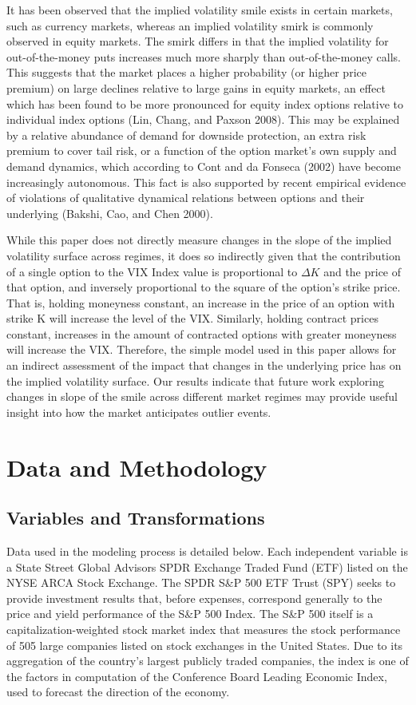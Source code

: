 \documentclass[11pt,a4paper,oldfontcommands]{memoir}
\begin{document}
{It has been observed that the implied volatility smile exists in certain markets, such as currency markets, whereas an implied volatility smirk is commonly observed in equity markets. The smirk differs in that the implied volatility for out-of-the-money puts increases much more sharply than out-of-the-money calls. This suggests that the market places a higher probability (or higher price premium) on large declines relative to large gains in equity markets, an effect which has been found to be more pronounced for equity index options relative to individual index options (Lin, Chang, and Paxson 2008). This may be explained by a relative abundance of demand for downside protection, an extra risk premium to cover tail risk, or a function of the option market’s own supply and demand dynamics, which according to Cont and da Fonseca (2002) have become increasingly autonomous. This fact is also supported by recent empirical evidence of violations of qualitative dynamical relations between options and their underlying (Bakshi, Cao, and Chen 2000).

While this paper does not directly measure changes in the slope of the implied volatility surface across regimes, it does so indirectly given that the contribution of a single option to the VIX Index value is proportional to $\Delta K$ and the price of that option, and inversely proportional to the square of the option’s strike price. That is, holding moneyness constant, an increase in the price of an option with strike K will increase the level of the VIX. Similarly, holding contract prices constant, increases in the amount of contracted options with greater moneyness will increase the VIX. Therefore, the simple model used in this paper allows for an indirect assessment of the impact that changes in the underlying price has on the implied volatility surface. Our results indicate that future work exploring changes in slope of the smile across different market regimes may provide useful insight into how the market anticipates outlier events. 


\section{Data and Methodology}

\subsection{Variables and Transformations}

Data used in the modeling process is detailed below. Each independent variable is a State Street Global Advisors SPDR Exchange Traded Fund (ETF) listed on the NYSE ARCA Stock Exchange. The SPDR S\&P 500 ETF Trust (SPY) seeks to provide investment results that, before expenses, correspond generally to the price and yield performance of the S\&P 500 Index. The S\&P 500 itself is a capitalization-weighted stock market index that measures the stock performance of 505 large companies listed on stock exchanges in the United States. Due to its aggregation of the country's largest publicly traded companies, the index is one of the factors in computation of the Conference Board Leading Economic Index, used to forecast the direction of the economy.

}
\end{document}
